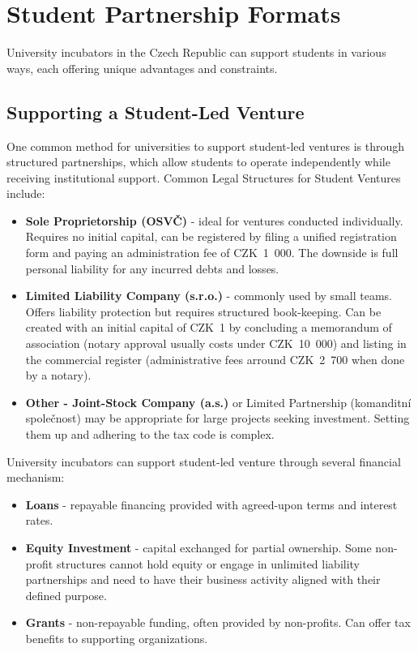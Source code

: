 \section{Student Partnership Formats}
University incubators in the Czech Republic can support students in various ways, each offering unique advantages and constraints.

\subsection{Supporting a Student-Led Venture}\label{subsec:supporting-student-venture}
One common method for universities to support student-led ventures is through structured partnerships, which allow students to operate independently while receiving institutional support. Common Legal Structures for Student Ventures include:
\begin{itemize}
    \item \textbf{Sole Proprietorship (OSVČ)} - ideal for ventures conducted individually. Requires no initial capital, can be registered by filing a unified registration form and paying an administration fee of CZK~1~000. The downside is full personal liability for any incurred debts and losses.
    \item \textbf{Limited Liability Company (s.r.o.)} - commonly used by small teams. Offers liability protection but requires structured book-keeping. Can be created with an initial capital of CZK~1 by concluding a memorandum of association (notary approval usually costs under CZK~10~000) and listing in the commercial register (administrative fees arround CZK~2~700 when done by a notary). 
    \item \textbf{Other - Joint-Stock Company (a.s.)} or Limited Partnership (komanditní společnost) may be appropriate for large projects seeking investment. Setting them up and adhering to the tax code is complex.
\end{itemize}

University incubators can support student-led venture through several financial mechanism:
\begin{itemize}
    \item \textbf{Loans} - repayable financing provided with agreed-upon terms and interest rates.
    \item \textbf{Equity Investment} - capital exchanged for partial ownership. Some non-profit structures cannot hold equity or engage in unlimited liability partnerships and need to have their business activity aligned with their defined purpose.
    \item \textbf{Grants} - non-repayable funding, often provided by non-profits. Can offer tax benefits to supporting organizations.
\end{itemize}

